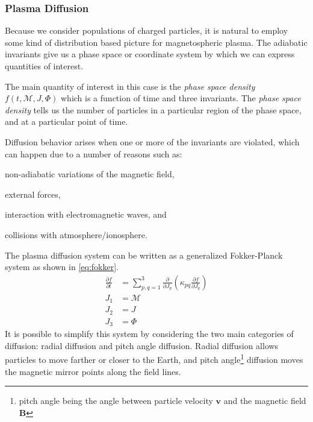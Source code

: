 \subsubsection*{Plasma Diffusion}

Because we consider populations of charged particles, it is natural to employ some kind of 
distribution based picture for magnetospheric plasma. The adiabatic invariants give us a phase 
space or coordinate system by which we can express quantities of interest. 

The main quantity of interest in this case is the \emph{phase space density} 
$f(t, \mathcal{M}, J, \Phi)$ which is a function of time and three invariants. The 
\emph{phase space density} tells us the number of particles in a particular region of the phase 
space, and at a particular point of time.

Diffusion behavior arises when one or more of the invariants are violated, which can happen due to 
a number of reasons such as: 
%
\begin{enumerate*}
    \item non-adiabatic variations of the magnetic field, 
    \item external forces, 
    \item interaction with electromagnetic waves, and 
    \item collisions with atmosphere/ionosphere. 
\end{enumerate*}
%
The plasma diffusion system \citep{schulz2012particle} can be written as a generalized 
Fokker-Planck system as shown in \cref{eq:fokker}.
%
\begin{align}\label{eq:fokker}
    \frac{\partial{f}}{\partial{t}} &= \sum^{3}_{p,q = 1}
    \frac{\partial}{\partial{J_{p}}} \left( \kappa_{pq}
    \frac{\partial{f}}{\partial{J_{q}}} \right) \\
    J_1 &= \mathcal{M} \\
    J_2 &= J \\
    J_{3} &= \Phi
\end{align}
%
It is possible to simplify this system by considering the two main categories of diffusion: radial 
diffusion and pitch angle diffusion. Radial diffusion allows particles to move farther or closer 
to the Earth, and pitch angle\footnote{pitch angle being the angle between particle velocity 
$\mathbf{v}$ and the magnetic field $\mathbf{B}$} diffusion moves the magnetic mirror points along 
the field lines.

